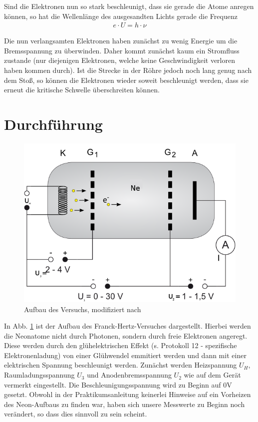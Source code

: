 \documentclass[12pt,a4paper,titlepage,headinclude,bibtotoc]{scrartcl}
\begin{document}
Sind die Elektronen nun so stark beschleunigt, dass sie gerade die Atome anregen können, so hat die Wellenlänge des ausgesandten Lichts gerade die Frequenz
\begin{align}
e\cdot U=h\cdot \nu \label{eq:eUhnu}
\end{align}

Die nun verlangsamten Elektronen haben zunächst zu wenig Energie um die Bremsspannung zu überwinden.
Daher kommt zunächst kaum ein Stromfluss zustande (nur diejenigen Elektronen, welche keine Geschwindigkeit verloren haben kommen durch).
Ist die Strecke in der Röhre jedoch noch lang genug nach dem Stoß, so können die Elektronen wieder soweit beschleunigt werden, dass sie erneut die kritische Schwelle überschreiten können.


\section{Durchführung}
\label{sec:durchfuehrung}
\begin{figure}[h]
\centering
\includegraphics{RoehreNe}
\caption{Aufbau des Versuchs, modifiziert nach \cite[12.03.2015,16 Uhr]{lp22}}
\label{fig:aufbau}
\end{figure}
In Abb. \ref{fig:aufbau} ist der Aufbau des Franck-Hertz-Versuches dargestellt.
Hierbei werden die Neonatome nicht durch Photonen, sondern durch freie Elektronen angeregt.
Diese werden durch den glühelektrischen Effekt (s. Protokoll 12 - spezifische Elektronenladung) von einer Glühwendel emmitiert werden und dann mit einer elektrischen Spannung beschleunigt werden.
Zunächst werden Heizspannung $U_H$, Raumladungsspannung $U_3$ und Anodenbremsspannung $U_2$ wie auf dem Gerät vermerkt eingestellt.
Die Beschleunigungsspannung wird zu Beginn auf $0\si\volt$ gesetzt.
Obwohl in der Praktikumsanleitung keinerlei Hinweise auf ein Vorheizen des Neon-Aufbaus zu finden war, haben sich unsere Messwerte zu Beginn noch verändert, so dass dies sinnvoll zu sein scheint.
\end{document}
